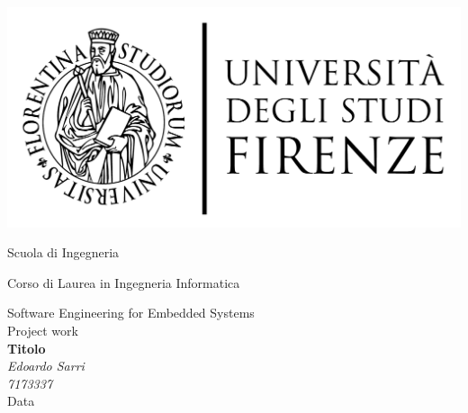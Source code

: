 \newcommand{\scuola}{
	{\fontsize{18pt}{\baselineskip}\selectfont Scuola di Ingegneria}}
\newcommand{\corso}{
    {\fontsize{16pt}{\baselineskip}\selectfont Corso di Laurea in Ingegneria Informatica}}
\newcommand{\lezione}{
	{\fontsize{14pt}{\baselineskip}\selectfont Software Engineering for Embedded Systems \\ Project work}}
 
\begin{titlepage}
    \centering
    \vspace{1cm}
    \includegraphics[scale=0.3]{immagini/logo UniFi.pdf} \\
    \vspace{1cm}
    \scuola \\
    \vspace{0.5cm}
    \corso \\
    \vspace{0.5cm}
    \lezione \\
    \vspace{4cm}
    {\Huge\bfseries Titolo} \\
    \vspace{2cm}
    {\Large\itshape Edoardo Sarri} \\
    \vspace{0.5cm}
    {\Large\itshape 7173337} \\
    \vfill
    {\fontsize{16pt}{\baselineskip}\selectfont Data}
\end{titlepage}
